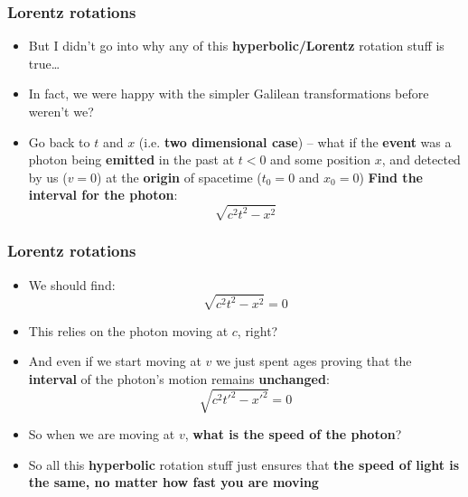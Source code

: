 \documentclass{beamer}
\begin{document}
\begin{frame}
  \frametitle{Lorentz rotations}
  \begin{itemize}
    \item<1-> But I didn't go into why any of this \textbf{hyperbolic/Lorentz} rotation stuff is true\ldots
    \item<2-> In fact, we were happy with the simpler Galilean transformations before weren't we?
    \item<3-> Go back to $t$ and $x$ (i.e. \textbf{two dimensional case}) -- what if the \textbf{event} was a photon being \textbf{emitted} in the past at $t<0$ and some position $x$, and detected by us ($v=0$) at the \textbf{origin} of spacetime ($t_0=0$ and $x_0=0$) \textbf{Find the interval for the photon}:
      \begin{equation*}
	\sqrt{c^2t^2-x^2}
      \end{equation*}
  \end{itemize}
\end{frame}

\begin{frame}
  \frametitle{Lorentz rotations}
  \begin{itemize}
    \item<1-> We should find:
      \begin{equation*}
	\sqrt{c^2t^2-x^2}=0
      \end{equation*}
    \item<2-> This relies on the photon moving at $c$, right?
    \item<3-> And even if we start moving at $v$ we just spent ages proving that the \textbf{interval} of the photon's motion remains \textbf{unchanged}:
      \begin{equation*}
	\sqrt{c^2t'^2-x'^2}=0
      \end{equation*}
    \item<4-> So when we are moving at $v$, \textbf{what is the speed of the photon}?
    \item<5-> So all this \textbf{hyperbolic} rotation stuff just ensures that \textbf{the speed of light is the same, no matter how fast you are moving}
  \end{itemize}
\end{frame}
\end{document}

